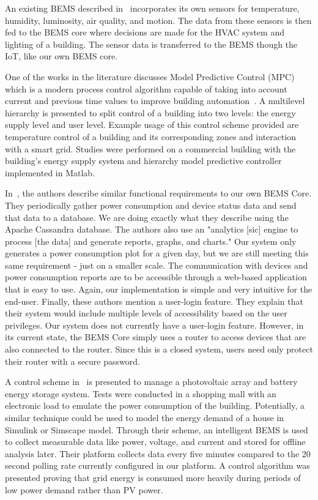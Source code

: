 \documentclass[letterpaper,12pt]{article}   %
\begin{document}
An existing BEMS described in~\cite{Mataloto2019} incorporates its own sensors for temperature, humidity, luminosity, air quality, and motion. The data from these sensors is then fed to the BEMS core where decisions are made for the HVAC system and lighting of a building. The sensor data is transferred to the BEMS though the IoT, like our own BEMS core. 

One of the works in the literature discusses Model Predictive Control (MPC) which is a modern process control algorithm capable of taking into account current and previous time values to improve building automation~\cite{Mayer2017}. A multilevel hierarchy is presented to split control of a building into two levels: the energy supply level and user level. Example usage of this control scheme provided are temperature control of a building and its corresponding zones and interaction with a smart grid. Studies were performed on a commercial building with the building's energy supply system and hierarchy model predictive controller implemented in Matlab.

In~\cite{8246800}, the authors describe similar functional requirements to our own BEMS Core. They periodically gather power consumption and device status data and send that data to a database. We are doing exactly what they describe using the Apache Cassandra database. The authors also use an "analytics [sic] engine to process [the data] and generate reports, graphs, and charts." Our system only generates a power consumption plot for a given day, but we are still meeting this same requirement - just on a smaller scale. The communication with devices and power consumption reports are to be accessible through a web-based application that is easy to use. Again, our implementation is simple and very intuitive for the end-user. Finally, these authors mention a user-login feature. They explain that their system would include multiple levels of accessibility based on the user privileges. Our system does not currently have a user-login feature. However, in its current state, the BEMS Core simply uses a router to access devices that are also connected to the router. Since this is a closed system, users need only protect their router with a secure password.

A control scheme in~\cite{Barchi2018} is presented to manage a photovoltaic array and battery energy storage system. Tests were conducted in a shopping mall with an electronic load to emulate the power consumption of the building. Potentially, a similar technique could be used to model the energy demand of a house in Simulink or Simscape model. Through their scheme, an intelligent BEMS is used to collect measurable data like power, voltage, and current and stored for offline analysis later. Their platform collects data every five minutes compared to the 20 second polling rate currently configured in our platform. A control algorithm was presented proving that grid energy is consumed more heavily during periods of low power demand rather than PV power.
\end{document}
